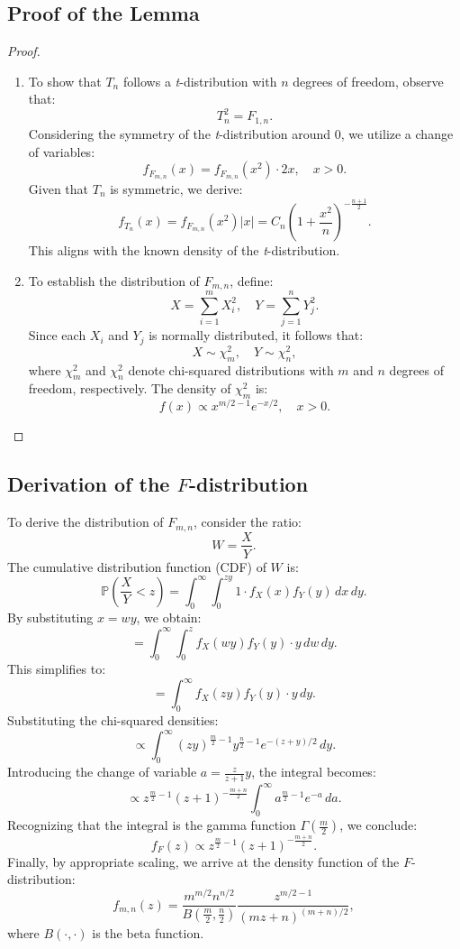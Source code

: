 \documentclass[open=any, 11pt,paper=A4]{scrreprt}
\begin{document}
\subsection*{Proof of the Lemma}

\begin{proof}
\begin{enumerate}
    \item 
    To show that \(T_n\) follows a \textit{t}-distribution with \(n\) degrees of freedom, observe that:
    \[
    T^2_n = F_{1,n}.
    \]
    Considering the symmetry of the \textit{t}-distribution around 0, we utilize a change of variables:
    \[
    f_{F_{m,n}}(x) = f_{F_{m,n}}(x^2) \cdot 2x, \quad x > 0.
    \]
    Given that \(T_n\) is symmetric, we derive:
    \[
    f_{T_n}(x) = f_{F_{m,n}}(x^2) |x| = C_n \left( 1 + \frac{x^2}{n} \right)^{-\frac{n+1}{2}}.
    \]
    This aligns with the known density of the \textit{t}-distribution.

    \item 
    To establish the distribution of \(F_{m,n}\), define:
    \[
    X = \sum_{i=1}^m X_i^2, \quad Y = \sum_{j=1}^n Y_j^2.
    \]
    Since each \(X_i\) and \(Y_j\) is normally distributed, it follows that:
    \[
    X \sim \chi^2_m, \quad Y \sim \chi^2_n,
    \]
    where \(\chi^2_m\) and \(\chi^2_n\) denote chi-squared distributions with \(m\) and \(n\) degrees of freedom, respectively. The density of \(\chi^2_m\) is:
    \[
    f(x) \propto x^{m/2 - 1} e^{-x/2}, \quad x > 0.
    \]
\end{enumerate}
\end{proof}

\subsection*{Derivation of the \(F\)-distribution}

To derive the distribution of \(F_{m,n}\), consider the ratio:
\[
W = \frac{X}{Y}.
\]
The cumulative distribution function (CDF) of \(W\) is:
\[
\mathbb{P}\left(\frac{X}{Y} < z\right) = \int_0^\infty \int_0^{zy} 1 \cdot f_X(x) f_Y(y) \, dx \, dy.
\]
By substituting \(x = wy\), we obtain:
\[
= \int_0^\infty \int_0^z f_X(wy) f_Y(y) \cdot y \, dw \, dy.
\]
This simplifies to:
\[
= \int_0^\infty f_X(zy) f_Y(y) \cdot y \, dy.
\]
Substituting the chi-squared densities:
\[
\propto \int_0^\infty (zy)^{\frac{m}{2} - 1} y^{\frac{n}{2} - 1} e^{-(z+y)/2} \, dy.
\]
Introducing the change of variable \(a = \frac{z}{z+1}y\), the integral becomes:
\[
\propto z^{\frac{m}{2} - 1} (z+1)^{-\frac{m+n}{2}} \int_0^\infty a^{\frac{m}{2} - 1} e^{-a} \, da.
\]
Recognizing that the integral is the gamma function \(\Gamma\left(\frac{m}{2}\right)\), we conclude:
\[
f_F(z) \propto z^{\frac{m}{2} - 1} (z+1)^{-\frac{m+n}{2}}.
\]
Finally, by appropriate scaling, we arrive at the density function of the \(F\)-distribution:
\[
f_{m,n}(z) = \frac{m^{m/2} n^{n/2}}{B\left(\frac{m}{2}, \frac{n}{2}\right)} \frac{z^{m/2 - 1}}{(m z + n)^{(m+n)/2}},
\]
where \(B(\cdot, \cdot)\) is the beta function.
\end{document}

